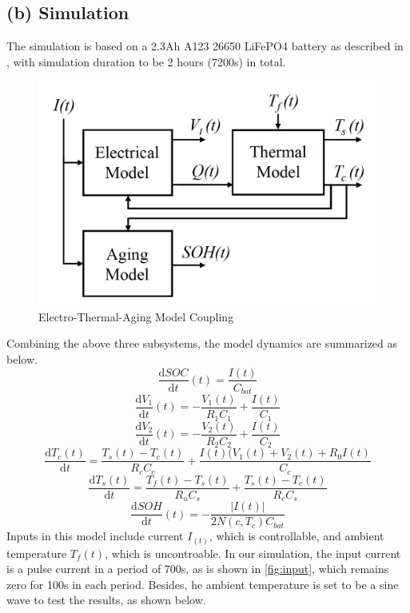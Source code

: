 \documentclass[10pt]{article}
\begin{document}
\subsection*{(b) Simulation}
The simulation is based on a 2.3Ah A123 26650 LiFePO4 battery as described in \cite{ref:1}, with simulation duration to be 2 hours (7200s) in total.
\begin{figure}[H]
	\centering
	\includegraphics[height=0.3\textwidth]{coupling.jpg}
	\caption{Electro-Thermal-Aging Model Coupling}
	\label{p2}
\end{figure}
\noindent Combining the above three subsystems, the model dynamics are summarized as below.
\begin{equation}
\frac{\mathrm{d} SOC}{\mathrm{d}t}(t) = \frac{I(t)}{C_{bat}}
\end{equation}
\begin{equation}
\frac{\mathrm{d} V_1}{\mathrm{d}t}(t) = -\frac{V_1(t)}{R_1C_1}+\frac{I(t)}{C_1}
\end{equation}
\begin{equation}
\frac{\mathrm{d} V_2}{\mathrm{d}t}(t) = -\frac{V_2(t)}{R_2C_2}+\frac{I(t)}{C_2}
\end{equation}
\begin{equation}
\frac{\mathrm{d}T_c(t)}{\mathrm{d} t} = \frac{T_s(t)-T_c(t)}{R_cC_c}+\frac{I(t)(V_1(t)+V_2(t)+R_0I(t)}{C_c}
\end{equation}
\begin{equation}
\frac{\mathrm{d}T_s(t)}{\mathrm{d} t} = \frac{T_f(t)-T_s(t)}{R_uC_s}+\frac{T_s(t)-T_c(t)}{R_cC_s}
\end{equation}
\begin{equation}
\frac{\mathrm{d} SOH}{\mathrm{d}t}(t) = -\frac{|I(t)|}{2N(c, T_c) C_{bat}}
\end{equation}
\noindent Inputs in this model include current $I_(t)$, which is controllable, and ambient temperature $T_f(t)$, which is uncontroable. 
In our simulation, the input current is a pulse current in a period of 700s, as is shown in \ref{fig:input}, which remains zero for 100s in each period. Besides, he ambient temperature is set to be a sine wave to test the results, as shown below.
\end{document}
